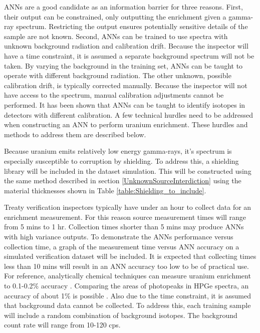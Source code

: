 \documentclass[tocnosub,noragright,centerchapter,12pt,fullpage]{uiucecethesis09}
\begin{document}
ANNs are a good candidate as an information barrier for three reasons. First, their output can be constrained, only outputting the enrichment given a gamma-ray spectrum. Restricting the output ensures potentially sensitive details of the sample are not known. Second, ANNs can be trained to use spectra with unknown background radiation and calibration drift. Because the inspector will have a time constraint, it is assumed a separate background spectrum will not be taken. By varying the background in the training set, ANNs can be taught to operate with different background radiation. The other unknown, possible calibration drift, is typically corrected manually. Because the inspector will not have access to the spectrum, manual calibration adjustments cannot be performed. It has been shown that ANNs can be taught to identify isotopes in detectors with different calibration.  A few technical hurdles need to be addressed when constructing an ANN to perform uranium enrichment. These hurdles and methods to address them are described below.

Because uranium emits relatively low energy gamma-rays, it's spectrum is especially susceptible to corruption by shielding. To address this, a shielding library will be included in the dataset simulation. This will be constructed using the same method described in section \ref{UnknownSourceInterdiction} using the material thicknesses shown in Table \ref{table:Shielding_to_include}.

Treaty verification inspectors typically have under an hour to collect data for an enrichment measurement. For this reason source measurement times will range from 5 mins to 1 hr. Collection times shorter than 5 mins may produce ANNs with high variance outputs. To demonstrate the ANNs performance versus collection time, a graph of the measurement time versus ANN accuracy on a simulated verification dataset will be included. It is expected that collecting times less than 10 mins will result in an ANN accuracy too low to be of practical use. For reference, analytically chemical techniques can measure uranium enrichment to 0.1-0.2\% accuracy \cite{Pandas_Ch7_1991}. Comparing the areas of photopeaks in HPGe spectra, an accuracy of about 1\% is possible \cite{Pandas_Ch7_1991}. Also due to the time constraint, it is assumed that background data cannot be collected. To address this, each training sample will include a random combination of background isotopes. The background count rate will range from 10-120 cps.
\end{document}
